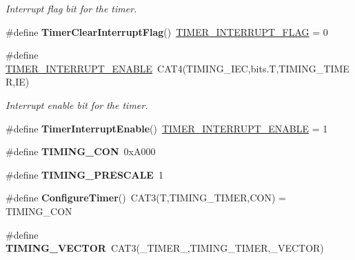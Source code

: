 \begin{DoxyCompactItemize}
\begin{DoxyCompactList}\small\item\em Interrupt flag bit for the timer. \end{DoxyCompactList}\item 
\hypertarget{group__timing_ga655652d7ea836f7f5c7a256a5f478612}{\#define {\bfseries Timer\+Clear\+Interrupt\+Flag}()~\hyperlink{group__timing_ga5e404b05086df678e0dc0b5d1d03d648}{T\+I\+M\+E\+R\+\_\+\+I\+N\+T\+E\+R\+R\+U\+P\+T\+\_\+\+F\+L\+A\+G} = 0}\label{group__timing_ga655652d7ea836f7f5c7a256a5f478612}

\item 
\hypertarget{group__timing_ga706576a08016b5a14b63b81f5abc2619}{\#define \hyperlink{group__timing_ga706576a08016b5a14b63b81f5abc2619}{T\+I\+M\+E\+R\+\_\+\+I\+N\+T\+E\+R\+R\+U\+P\+T\+\_\+\+E\+N\+A\+B\+L\+E}~C\+A\+T4(T\+I\+M\+I\+N\+G\+\_\+\+I\+E\+C,bits.\+T,T\+I\+M\+I\+N\+G\+\_\+\+T\+I\+M\+E\+R,I\+E)}\label{group__timing_ga706576a08016b5a14b63b81f5abc2619}

\begin{DoxyCompactList}\small\item\em Interrupt enable bit for the timer. \end{DoxyCompactList}\item 
\hypertarget{group__timing_ga5da9c81a58d4e659363dc9dc8aaf3d92}{\#define {\bfseries Timer\+Interrupt\+Enable}()~\hyperlink{group__timing_ga706576a08016b5a14b63b81f5abc2619}{T\+I\+M\+E\+R\+\_\+\+I\+N\+T\+E\+R\+R\+U\+P\+T\+\_\+\+E\+N\+A\+B\+L\+E} = 1}\label{group__timing_ga5da9c81a58d4e659363dc9dc8aaf3d92}

\item 
\hypertarget{group__timing_ga23e169025a051520fb0868984a8e0940}{\#define {\bfseries T\+I\+M\+I\+N\+G\+\_\+\+C\+O\+N}~0x\+A000}\label{group__timing_ga23e169025a051520fb0868984a8e0940}

\item 
\hypertarget{group__timing_gad72f862b30bf264008be594c176b4fae}{\#define {\bfseries T\+I\+M\+I\+N\+G\+\_\+\+P\+R\+E\+S\+C\+A\+L\+E}~1}\label{group__timing_gad72f862b30bf264008be594c176b4fae}

\item 
\hypertarget{group__timing_gafa1887a89897854e44eda9652eb7d72b}{\#define {\bfseries Configure\+Timer}()~C\+A\+T3(T,T\+I\+M\+I\+N\+G\+\_\+\+T\+I\+M\+E\+R,C\+O\+N) = T\+I\+M\+I\+N\+G\+\_\+\+C\+O\+N}\label{group__timing_gafa1887a89897854e44eda9652eb7d72b}

\item 
\hypertarget{group__timing_ga491b3c671593195125fc8c5390dc663b}{\#define {\bfseries T\+I\+M\+I\+N\+G\+\_\+\+V\+E\+C\+T\+O\+R}~C\+A\+T3(\+\_\+\+T\+I\+M\+E\+R\+\_\+,T\+I\+M\+I\+N\+G\+\_\+\+T\+I\+M\+E\+R,\+\_\+\+V\+E\+C\+T\+O\+R)}\label{group__timing_ga491b3c671593195125fc8c5390dc663b}


\end{DoxyCompactItemize}
